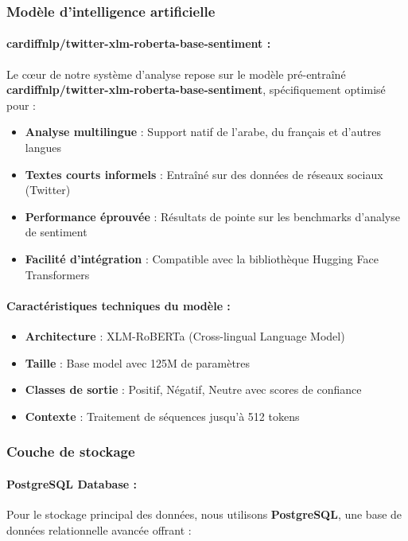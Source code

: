 \subsubsection{Modèle d'intelligence artificielle}

\paragraph{cardiffnlp/twitter-xlm-roberta-base-sentiment :}
Le cœur de notre système d'analyse repose sur le modèle pré-entraîné \textbf{cardiffnlp/twitter-xlm-roberta-base-sentiment}, spécifiquement optimisé pour :

\begin{itemize}
    \item \textbf{Analyse multilingue} : Support natif de l'arabe, du français et d'autres langues
    \item \textbf{Textes courts informels} : Entraîné sur des données de réseaux sociaux (Twitter)
    \item \textbf{Performance éprouvée} : Résultats de pointe sur les benchmarks d'analyse de sentiment
    \item \textbf{Facilité d'intégration} : Compatible avec la bibliothèque Hugging Face Transformers
\end{itemize}

\paragraph{Caractéristiques techniques du modèle :}
\begin{itemize}
    \item \textbf{Architecture} : XLM-RoBERTa (Cross-lingual Language Model)
    \item \textbf{Taille} : Base model avec 125M de paramètres
    \item \textbf{Classes de sortie} : Positif, Négatif, Neutre avec scores de confiance
    \item \textbf{Contexte} : Traitement de séquences jusqu'à 512 tokens
\end{itemize}

\subsubsection{Couche de stockage}

\paragraph{PostgreSQL Database :}
Pour le stockage principal des données, nous utilisons \textbf{PostgreSQL}, une base de données relationnelle avancée offrant :

